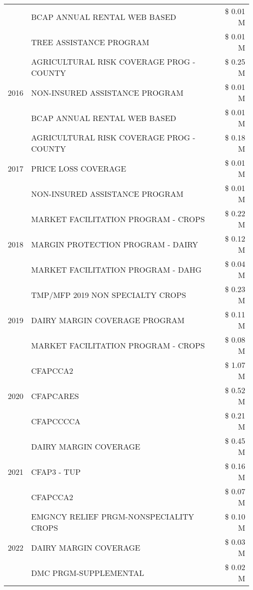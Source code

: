 \begin{tabular}{llr}
 & BCAP ANNUAL RENTAL WEB BASED & \$ 0.01 M \\
 & TREE ASSISTANCE PROGRAM & \$ 0.01 M \\
\cline{1-3}
\multirow[t]{3}{*}{2016} & AGRICULTURAL RISK COVERAGE PROG - COUNTY & \$ 0.25 M \\
 & NON-INSURED ASSISTANCE PROGRAM & \$ 0.01 M \\
 & BCAP ANNUAL RENTAL WEB BASED & \$ 0.01 M \\
\cline{1-3}
\multirow[t]{3}{*}{2017} & AGRICULTURAL RISK COVERAGE PROG - COUNTY & \$ 0.18 M \\
 & PRICE LOSS COVERAGE & \$ 0.01 M \\
 & NON-INSURED ASSISTANCE PROGRAM & \$ 0.01 M \\
\cline{1-3}
\multirow[t]{3}{*}{2018} & MARKET FACILITATION PROGRAM - CROPS & \$ 0.22 M \\
 & MARGIN PROTECTION PROGRAM - DAIRY & \$ 0.12 M \\
 & MARKET FACILITATION PROGRAM - DAHG & \$ 0.04 M \\
\cline{1-3}
\multirow[t]{3}{*}{2019} & TMP/MFP 2019 NON SPECIALTY CROPS & \$ 0.23 M \\
 & DAIRY MARGIN COVERAGE PROGRAM & \$ 0.11 M \\
 & MARKET FACILITATION PROGRAM - CROPS & \$ 0.08 M \\
\cline{1-3}
\multirow[t]{3}{*}{2020} & CFAPCCA2 & \$ 1.07 M \\
 & CFAPCARES & \$ 0.52 M \\
 & CFAPCCCCA & \$ 0.21 M \\
\cline{1-3}
\multirow[t]{3}{*}{2021} & DAIRY MARGIN COVERAGE & \$ 0.45 M \\
 & CFAP3 - TUP & \$ 0.16 M \\
 & CFAPCCA2 & \$ 0.07 M \\
\cline{1-3}
\multirow[t]{3}{*}{2022} & EMGNCY RELIEF PRGM-NONSPECIALITY CROPS & \$ 0.10 M \\
 & DAIRY MARGIN COVERAGE & \$ 0.03 M \\
 & DMC PRGM-SUPPLEMENTAL & \$ 0.02 M \\
\cline{1-3}
\bottomrule
\end{tabular}
